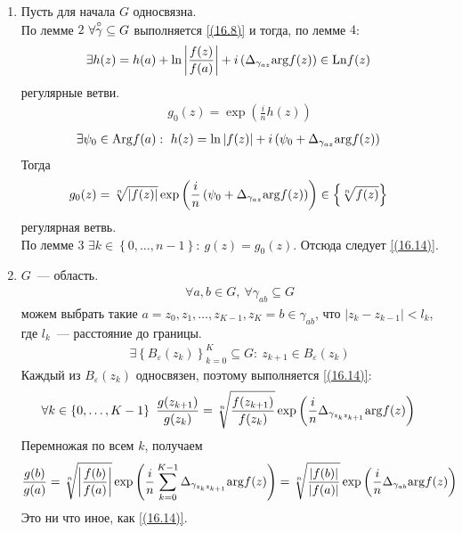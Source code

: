 \begin{enumerate}
    \item Пусть для начала $G$ односвязна.
    \\
    По лемме $2$ $\forall \overset{\circ}{\gamma} \subseteq G$ выполняется
    \eqref{(16.8)} и тогда, по лемме $4$:
    \begin{align*}
      & \exists h(z) = h(a) + \ln \left|\frac{f(z)}{f(a)}\right|+ i\left(\Delta_{\gamma_{az}}\mathrm{arg} f(z)\right) \in \mathrm{Ln} f(z)
    \end{align*}
    регулярные ветви.
    \begin{align*}
      & g_0(z) = \exp \left(\frac{i}{n} h(z)\right)
    \end{align*}
    \begin{align*}
      & \exists \psi_0 \in \mathrm{Arg} f(a): \ h(z) = \ln \left| f(z) \right| + i \left( \psi_0 + \Delta_{\gamma_{az}}\mathrm{arg} f(z) \right)
    \end{align*}
    Тогда
    \begin{align*}
      & g_0(z) = \sqrt[n]{\left| f(z) \right|}\exp \left( \frac{i}{n} \left( \psi_0 + \Delta_{\gamma_{az}}\mathrm{arg} f(z) \right) \right)\in \left\{ \sqrt[n]{f(z)} \right\}
    \end{align*}
    регулярная ветвь.
    \\
    По лемме $3$ $\exists k \in \left\{ 0, \dots, n-1 \right\}: \ g(z) = g_0(z)$.
    Отсюда следует \eqref{(16.14)}.
    \item $G$~--- область.
    \begin{align*}
      &\forall a, b \in G, \ \forall \gamma_{ab} \subseteq G
    \end{align*}
    можем выбрать такие $a=z_0, z_1, \dots, z_{K-1}, z_K = b \in \gamma_{ab}$,
    что $\left| z_k - z_{k-1} \right|< l_k$, где $l_k$~--- расстояние до
    границы.
    \begin{align*}
      & \exists \left\{ B_\varepsilon(z_k) \right\}_{k=0}^K \subseteq G: \ z_{k+1} \in B_{\varepsilon}(z_k)
    \end{align*}
    Каждый из $B_{\varepsilon}(z_k)$ односвязен, поэтому выполняется
    \eqref{(16.14)}:
    \begin{align*}
      & \forall k \in \left\{ 0, \dots, K-1 \right\} \ \frac{g(z_{k+1})}{g(z_k)} = \sqrt[n]{\frac{f(z_{k+1})}{f(z_k)}} \exp \left( \frac{i}{n} \Delta_{\gamma_{z_kz_{k+1}}}\argt f(z) \right)
    \end{align*}
    Перемножая по всем $k$, получаем
    \begin{align*}
      & \frac{g(b)}{g(a)} = \sqrt[n]{\left| \frac{f(b)}{f(a)} \right|}\exp \left( \frac{i}{n} \sum_{k=0}^{K-1} \Delta_{\gamma_{z_kz_{k+1}}} \mathrm{arg} f(z) \right) = \sqrt[n]{\frac{\left| f(b) \right|}{\left| f(a) \right|}}\exp \left( \frac{i}{n}\Delta_{\gamma_{ab}}\mathrm{arg} f(z) \right)
    \end{align*}
    Это ни что иное, как \eqref{(16.14)}.
\end{enumerate}\theorem
